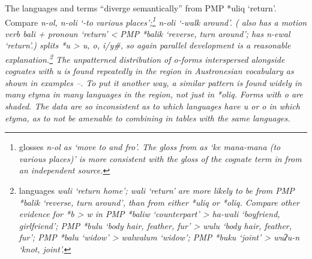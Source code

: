 The  languages 
and  terms “diverge semantically” from PMP *uliq ‘return’.
Compare  \it{n-ol, n-oli} ‘-to various places’;\footnote{
		\citet[247]{Blust1993}
		glosses  \it{n-ol} as ‘move to and fro’.
		The gloss from \citet{MettlerMettler1996} as ‘ke mana-mana (to
		various places)’ is more consistent with the gloss of the cognate
		term in  from an independent source.}
 \it{n-oli} ‘-walk around’.
( also has a motion verb \it{bali} + pronoun ‘return’
< PMP *balik ‘reverse,
turn around’;  has \it{n-ewal} ‘return’.)  splits
*u > \it{u, o, i/y}{\#}, so again parallel development is a reasonable explanation.\footnote{
		 languages  \it{wali} ‘return home’;  \it{wali}
		‘return’ are more likely to be from PMP *balik ‘reverse,
		turn around’, than from either *uliq or *oliq.
		Compare other evidence for *b > \it{w} in PMP *baliw ‘counterpart’
		>  \it{ha-wali} ‘boyfriend,
		girlfriend’; PMP *bulu ‘body hair,
		feather, fur’ >  \it{wulu} ‘body hair,
		feather, fur’; PMP *balu ‘widow’ >  \it{wal{\tl}walum} ‘widow’;
		PMP *buku ‘joint’ >  \it{wuʔu-n} ‘knot,
		joint’.} 
The unpatterned distribution of \it{o}-forms interspersed alongside
cognates with \it{u} is found repeatedly in the region in Austronesian
vocabulary as shown in examples --.
To put it another way,
a similar pattern is found widely in many etyma in many languages
in the region, not just in *oliq.
Forms with \it{o} are shaded.
The data are so inconsistent as to which languages have \it{u}
or \it{o} in which etyma,
as to not be amenable to combining in tables with the same languages.

